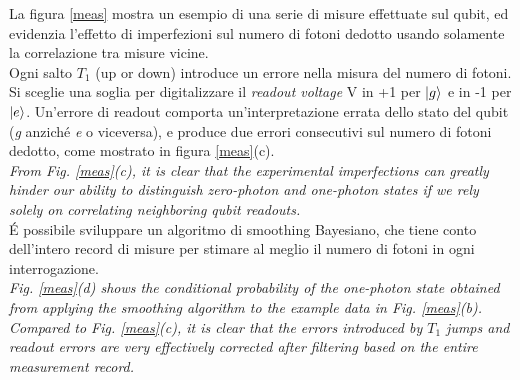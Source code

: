 \documentclass[10pt,a4paper]{article}
\begin{document}
La figura \ref{meas} mostra un esempio di una serie di misure effettuate sul qubit, ed evidenzia l'effetto di imperfezioni sul numero di fotoni dedotto usando solamente la correlazione tra misure vicine.\\

Ogni salto $T_1$ (up or down) introduce un errore nella misura del numero di fotoni.\\
Si sceglie una soglia per digitalizzare il \textit{readout voltage} V in +1 per $\ket{g}$ e in -1 per $\ket{e}$. Un'errore di readout comporta un'interpretazione errata dello stato del qubit (\textit{g} anziché \textit{e} o viceversa), e produce due errori consecutivi sul numero di fotoni dedotto, come mostrato in figura \ref{meas}(c).\\

\textit{From Fig. \ref{meas}(c), it
is clear that the experimental imperfections can greatly
hinder our ability to distinguish zero-photon and one-photon
states if we rely solely on correlating neighboring
qubit readouts.}\\

\'E possibile sviluppare un algoritmo di smoothing Bayesiano, che tiene conto dell'intero record di misure per stimare al meglio il numero di fotoni in ogni interrogazione.\\

\textit{Fig. \ref{meas}(d) shows the conditional probability of the
one-photon state obtained from applying the smoothing algorithm to the example data in Fig. \ref{meas}(b). Compared
to Fig. \ref{meas}(c), it is clear that the errors introduced by $T_1$
jumps and readout errors are very effectively corrected
after filtering based on the entire measurement record.}
\end{document}
